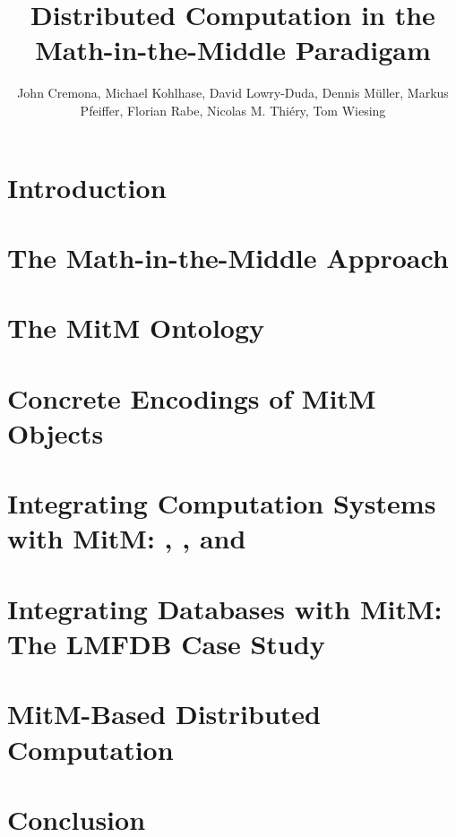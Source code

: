 \documentclass{article}
\title{Distributed Computation in the Math-in-the-Middle Paradigam}
\author{John Cremona, Michael Kohlhase, David Lowry-Duda, Dennis M\"uller, Markus Pfeiffer, Florian Rabe, Nicolas M. Thiéry, Tom Wiesing}
\begin{document}
\begin{abstract}\end{abstract}
\maketitle
\setcounter{tocdepth}{2}
\newpage\tableofcontents\newpage

\section{Introduction}\label{sec:intro}
\newpage

\section[Math-in-the-Middle]{The Math-in-the-Middle Approach}\label{sec:mitm}
\newpage

\section[MitM Ontology]{The MitM Ontology}\label{sec:cgt}
\newpage

\section{Concrete Encodings of MitM Objects}\label{sec:codecs}
\newpage

\section[Computation Systems]{Integrating Computation Systems with MitM: \GAP, \Sage, and \Singular}\label{sec:apit}
\newpage

\section[Databases]{Integrating Databases with MitM: The LMFDB Case Study}\label{sec:databases}
\newpage
\section[Distributed Computation]{MitM-Based Distributed Computation}\label{sec:case}
\newpage

\section{Conclusion}\label{sec:concl}


\printbibliography
\end{document}
